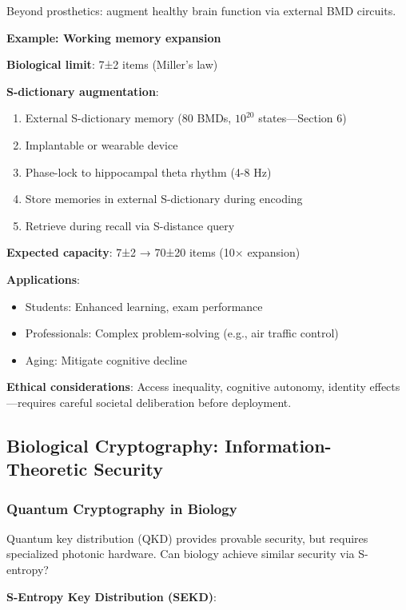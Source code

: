 \documentclass[11pt,a4paper]{article}
\begin{document}
Beyond prosthetics: augment healthy brain function via external BMD circuits.

\textbf{Example: Working memory expansion}

\textbf{Biological limit}: 7±2 items (Miller's law\cite{miller1956magical})

\textbf{S-dictionary augmentation}:
\begin{enumerate}
\item External S-dictionary memory (80 BMDs, $10^{20}$ states—Section 6)
\item Implantable or wearable device
\item Phase-lock to hippocampal theta rhythm (4-8 Hz)
\item Store memories in external S-dictionary during encoding
\item Retrieve during recall via S-distance query
\end{enumerate}

\textbf{Expected capacity}: 7±2 → 70±20 items (10$\times$ expansion)

\textbf{Applications}:
\begin{itemize}
\item Students: Enhanced learning, exam performance
\item Professionals: Complex problem-solving (e.g., air traffic control)
\item Aging: Mitigate cognitive decline
\end{itemize}

\textbf{Ethical considerations}: Access inequality, cognitive autonomy, identity effects—requires careful societal deliberation before deployment.

\subsection{Biological Cryptography: Information-Theoretic Security}

\subsubsection{Quantum Cryptography in Biology}

Quantum key distribution (QKD) provides provable security\cite{gisin2002quantum}, but requires specialized photonic hardware. Can biology achieve similar security via S-entropy?

\textbf{S-Entropy Key Distribution (SEKD)}:
\end{document}
